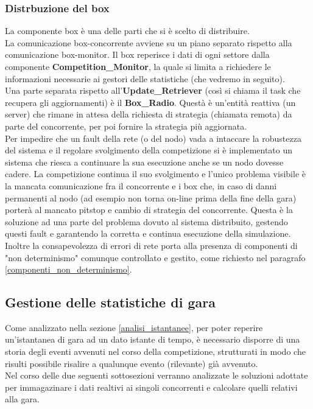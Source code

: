      \subsubsection{Distrbuzione del box}
La componente box è una delle parti che si è scelto di distribuire.\\
La comunicazione box-concorrente avviene su un piano separato rispetto alla comunicazione box-monitor.
Il box reperisce i dati di ogni settore dalla componente \textbf{Competition\_Monitor}, la quale si limita
a richiedere le informazioni necessarie ai gestori delle statistiche (che vedremo in seguito).\\
Una parte separata rispetto all'\textbf{Update\_Retriever} (così si chiama il task che recupera gli aggiornamenti) è
il \textbf{Box\_Radio}. Questà è un'entità reattiva (un server) che rimane in attesa della richiesta di strategia (chiamata remota)
da parte del concorrente, per poi fornire la strategia più aggiornata.\\
Per impedire che un fault della rete (o del nodo) vada a intaccare la robustezza
del sistema e il regolare svolgimento della competizione si è implementato un sistema che riesca a continuare la
sua esecuzione anche se un nodo dovesse cadere. La competizione continua il suo
svolgimento e l'unico problema visibile è la mancata comunicazione fra il
concorrente e i box che, in caso di danni permanenti al nodo (ad esempio non
torna on-line prima della fine della gara) porterà al mancato pitstop e cambio
di strategia del concorrente. Questa è la soluzione ad una parte del problema
dovuto al sistema distribuito, gestendo questi fault e garantendo la corretta e
continua esecuzione della simulazione.
Inoltre la consapevolezza di errori di rete porta alla presenza di componenti di
"non determinismo" comunque controllato e gestito, come richiesto nel paragrafo
\ref{componenti_non_determinismo}.
\subsection{Gestione delle statistiche di gara}
\label{statistiche}
Come analizzato nella sezione \ref{analisi_istantanee}, per poter reperire
un'istantanea di gara ad un dato istante di tempo, è necessario
disporre di una storia degli eventi avvenuti nel corso della competizione,
strutturati in modo che risulti possibile risalire a qualunque evento
(rilevante) già avvenuto.\\ 
Nel corso delle due seguenti sottosezioni verranno analizzate le soluzioni
adottate per immagazinare i dati realtivi ai singoli concorrenti
e calcolare quelli relativi alla gara.
